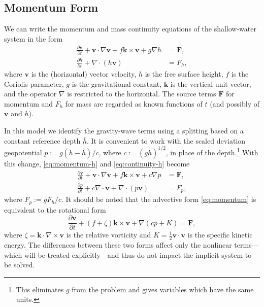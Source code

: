\documentclass[12pt]{article}
\newcommand{\vecv}{\mathbf{v}}
\newcommand{\veck}{\mathbf{k}}
\newcommand{\Fmom}{\mathbf{F}}
\newcommand{\Fmass}{F_h}
\newcommand{\Fphi}{F_\p}
\newcommand{\href}{\bar{h}}
\newcommand{\p}{{p}}   %
\newcommand{\cross}{\times}
\newcommand{\del}{\nabla}
\begin{document}
\pagebreak[2]
\subsection{Momentum Form\label{sec:momentum}}

We can write the momentum and mass continuity equations of the shallow-water
system in the form
\begin{align}
  \frac{\partial \vecv}{\partial t} + \vecv\cdot\del\vecv 
    + f\veck\cross\vecv + g\del h &= \Fmom, 
\label{eq:momentum-h}
\\
  \frac{\partial h}{\partial t} + \del\cdot(h\vecv) &= \Fmass,
\label{eq:continuity-h}
\end{align}
where $\vecv$ is the (horizontal) vector velocity, $h$ is the free surface
height, $f$ is the Coriolis parameter, $g$ is the gravitational constant,
$\veck$ is the vertical unit vector, and the operator $\del$ is restricted to
the horizontal.  The source terms $\Fmom$ for momentum and $\Fmass$ for mass
are regarded as known functions of $t$ (and possibly of $\vecv$ and $h$).

In this model we identify the gravity-wave terms using a splitting based on a
constant reference depth $\href$.  It is convenient to work with the scaled
deviation geopotential $\p := g(h-\href)/c$, where $c:=(g\href)^{1/2}$, in
place of the depth.\footnote{This eliminates $g$ from the problem and gives
variables which have the same units.}  With this change, 
\eqref{eq:momentum-h} and \eqref{eq:continuity-h} become
\begin{align}
  \frac{\partial \vecv}{\partial t} + \vecv\cdot\del\vecv 
    + f\veck\cross\vecv + c\del \p &= \Fmom, 
\label{eq:momentum}
\\
  \frac{\partial\p}{\partial t} + c\del\cdot\vecv + \del\cdot(\p\vecv) 
      &= \Fphi ,
\label{eq:continuity}
\end{align}
where $\Fphi := g\Fmass/c$.
It should be noted that the advective form \eqref{eq:momentum} is equivalent
to the rotational form
\begin{equation}
  \frac{\partial \vecv}{\partial t} + (f+\zeta)\veck\cross\vecv 
   + \del(c\p + K) = \Fmom, 
\label{eq:rotational}
\end{equation}
where $\zeta = \veck\cdot\del\cross\vecv$ is the relative vorticity and
$K=\frac12\vecv\cdot\vecv$ is the specific kinetic energy.  The differences
between these two forms affect only the nonlinear terms---which will be
treated explicitly---and thus do not impact the implicit system to be solved.
\end{document}
